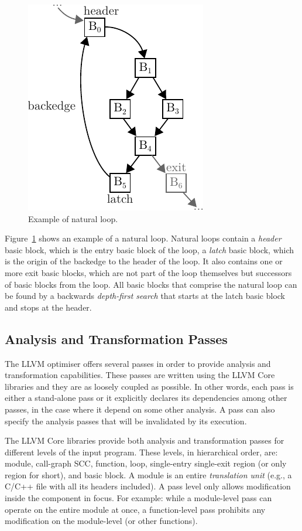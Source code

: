 \begin{figure}[h]
  \centering
  \includegraphics[scale=1]{figs/natural-loop.pdf}
  \caption{Example of natural loop.}
  \label{fig:natural-loops}
\end{figure}

Figure~\ref{fig:natural-loops} shows an example of a natural loop.
Natural loops contain a \textit{header} basic block, which is the entry basic block of the loop,
a \textit{latch} basic block, which is the origin of the backedge to the header of the loop.
It also contains one or more exit basic blocks, which are not part of the loop themselves but successors of basic blocks from the loop.
All basic blocks that comprise the natural loop can be found by a backwards \textit{depth-first search} that starts at the latch basic block and stops at the header.
 
\subsection{Analysis and Transformation Passes}

The LLVM optimiser offers several passes in order to provide analysis and transformation capabilities.
These passes are written using the LLVM Core libraries and they are as loosely coupled as possible.
In other words, each pass is either a stand-alone pass or it explicitly declares its dependencies among other passes, in the case where it depend on some other analysis.
A pass can also specify the analysis passes that will be invalidated by its execution.

The LLVM Core libraries provide both analysis and transformation passes for different levels of the input program.
These levels, in hierarchical order, are: module, call-graph SCC, function, loop, single-entry single-exit region (or only region for short), and basic block.
A module is an entire \textit{translation unit} (e.g., a C/C++ file with all its headers included).
A pass level only allows modification inside the component in focus.
For example: while a module-level pass can operate on the entire module at once,
a function-level pass prohibits any modification on the module-level (or other functions).

